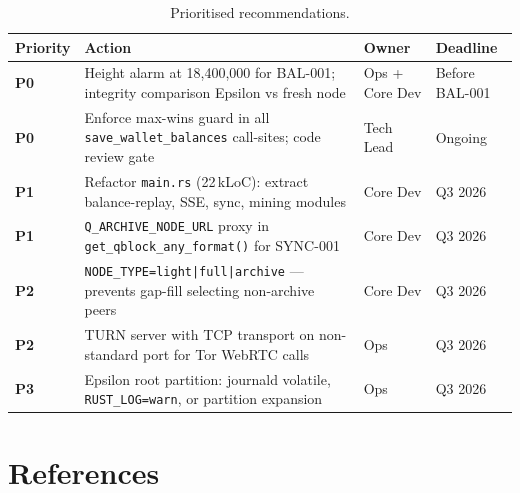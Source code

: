 \documentclass[12pt,a4paper]{article}
\begin{document}
\begin{table}[H]
\centering
\small
\begin{tabularx}{\linewidth}{lXll}
\toprule
\textbf{Priority} & \textbf{Action} & \textbf{Owner} & \textbf{Deadline} \\
\midrule
\textbf{P0} & Height alarm at 18,400,000 for BAL-001; integrity comparison Epsilon vs fresh node & Ops + Core Dev & Before BAL-001 \\
\rowcolor{rowgray}
\textbf{P0} & Enforce max-wins guard in all \texttt{save\_wallet\_balances} call-sites; code review gate & Tech Lead & Ongoing \\
\textbf{P1} & Refactor \texttt{main.rs} (22\,kLoC): extract balance-replay, SSE, sync, mining modules & Core Dev & Q3 2026 \\
\rowcolor{rowgray}
\textbf{P1} & \texttt{Q\_ARCHIVE\_NODE\_URL} proxy in \texttt{get\_qblock\_any\_format()} for SYNC-001 & Core Dev & Q3 2026 \\
\textbf{P2} & \texttt{NODE\_TYPE=light|full|archive} — prevents gap-fill selecting non-archive peers & Core Dev & Q3 2026 \\
\rowcolor{rowgray}
\textbf{P2} & TURN server with TCP transport on non-standard port for Tor WebRTC calls & Ops & Q3 2026 \\
\textbf{P3} & Epsilon root partition: journald volatile, \texttt{RUST\_LOG=warn}, or partition expansion & Ops & Q3 2026 \\
\bottomrule
\end{tabularx}
\caption{Prioritised recommendations.}
\end{table}

\section{References}
\end{document}
